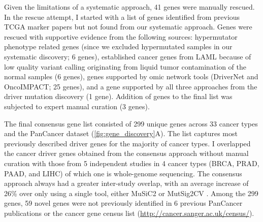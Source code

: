 Given the limitations of a systematic approach, 41 genes were manually rescued. In the rescue attempt, I started with a list of genes identified from previous TCGA marker papers but not found from our systematic approach. Genes were rescued with supportive evidence from the following sources: hypermutator phenotype related genes (since we excluded hypermutated samples in our systematic discovery; 6 genes), established cancer genes from LAML because of low quality variant calling originating from liquid tumor contamination of the normal samples (6 genes), genes supported by omic network tools (DriverNet and OncoIMPACT; 25 genes), and a gene supported by all three approaches from the driver mutation discovery (1 gene). Addition of genes to the final list was subjected to expert manual curation (3 genes). 

The final consensus gene list consisted of 299 unique genes across 33 cancer types and the PanCancer dataset (\autoref{fig:gene_discovery}A). The list captures most previously described driver genes for the majority of cancer types. I overlapped the cancer driver genes obtained from the consensus approach without manual curation with those from 5 independent studies in 4 cancer types (BRCA, PRAD, PAAD, and LIHC) of which one is whole-genome sequencing. The consensus approach always had a greater inter-study overlap, with an average increase of 26\% over only using a single tool, either MuSiC2 or MutSig2CV \cite{RN57, RN176, RN175, RN172, RN173, RN174}. Among the 299 genes, 59 novel genes were not previously identified in 6 previous PanCancer publications \cite{RN57, RN14, RN178, RN25, RN96, RN177, RN1} or the cancer gene census list (\url{http://cancer.sanger.ac.uk/census/})\cite{RN97}.

